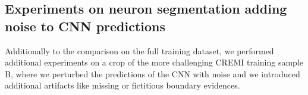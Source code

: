 

\subsection{Experiments on neuron segmentation adding noise to CNN predictions} \label{sec:appendix_noise_gen}
Additionally to the comparison on the full training dataset, we performed additional experiments on a crop of the more challenging CREMI training sample B, where we perturbed the predictions of the CNN with noise and we introduced additional artifacts like missing or fictitious boundary evidences.


